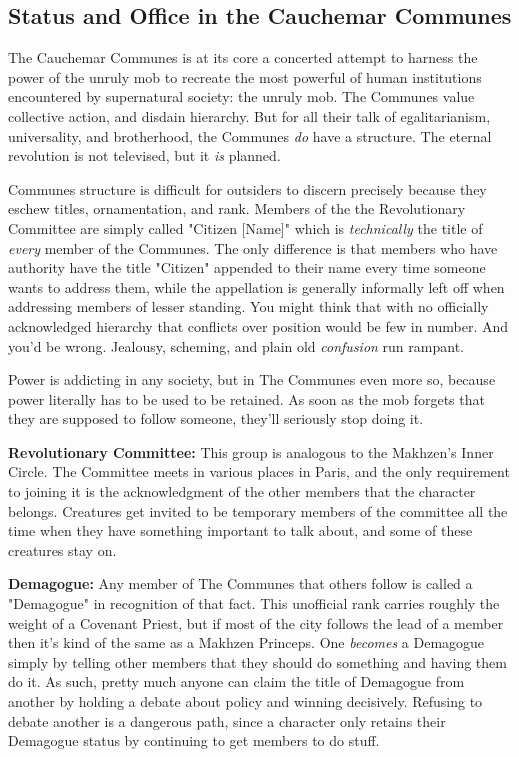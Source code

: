 \subsection{Status and Office in the Cauchemar Communes} 

The Cauchemar Communes is at its core a concerted attempt to harness the power of the unruly mob to recreate the most powerful of human institutions encountered by supernatural society: the unruly mob. The Communes value collective action, and disdain hierarchy. But for all their talk of egalitarianism, universality, and brotherhood, the Communes \textit{do} have a structure. The eternal revolution is not televised, but it \textit{is} planned. 

Communes structure is difficult for outsiders to discern precisely because they eschew titles, ornamentation, and rank. Members of the the Revolutionary Committee are simply called "Citizen [Name]" which is \textit{technically} the title of \textit{every} member of the Communes. The only difference is that members who have authority have the title "Citizen" appended to their name every time someone wants to address them, while the appellation is generally informally left off when addressing members of lesser standing. You might think that with no officially acknowledged hierarchy that conflicts over position would be few in number. And you'd be wrong. Jealousy, scheming, and plain old \textit{confusion} run rampant.

Power is addicting in any society, but in The Communes even more so, because power literally has to be used to be retained. As soon as the mob forgets that they are supposed to follow someone, they'll seriously stop doing it. 

\textbf{Revolutionary Committee:} This group is analogous to the Makhzen's Inner Circle. The Committee meets in various places in Paris, and the only requirement to joining it is the acknowledgment of the other members that the character belongs. Creatures get invited to be temporary members of the committee all the time when they have something important to talk about, and some of these creatures stay on.

\textbf{Demagogue:} Any member of The Communes that others follow is called a "Demagogue" in recognition of that fact. This unofficial rank carries roughly the weight of a Covenant Priest, but if most of the city follows the lead of a member then it's kind of the same as a Makhzen Princeps. One \textit{becomes} a Demagogue simply by telling other members that they should do something and having them do it. As such, pretty much anyone can claim the title of Demagogue from another by holding a debate about policy and winning decisively. Refusing to debate another is a dangerous path, since a character only retains their Demagogue status by continuing to get members to do stuff.

